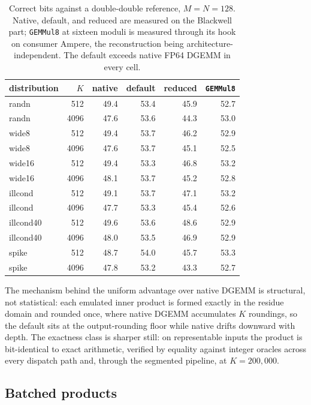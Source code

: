 \documentclass[11pt]{amsart}
\theoremstyle{plain}
\theoremstyle{definition}
\newcommand{\code}[1]{\texttt{#1}}
\newcommand{\gemmul}{\code{GEMMul8}}
\begin{document}
\begin{table}[t]
\centering
\caption{Correct bits against a double-double reference, $M = N = 128$.
Native, default, and reduced are measured on the Blackwell part;
\gemmul{} at sixteen moduli is measured through its hook on consumer
Ampere, the reconstruction being architecture-independent. The default
exceeds native FP64 DGEMM in every cell.}
\label{tab:accuracy}
\begin{tabular}{lrrrrr}
\toprule
distribution & $K$ & native & default & reduced & \gemmul{} \\
\midrule
randn & 512 & 49.4 & 53.4 & 45.9 & 52.7 \\
randn & 4096 & 47.6 & 53.6 & 44.3 & 53.0 \\
wide8 & 512 & 49.4 & 53.7 & 46.2 & 52.9 \\
wide8 & 4096 & 47.6 & 53.7 & 45.1 & 52.5 \\
wide16 & 512 & 49.4 & 53.3 & 46.8 & 53.2 \\
wide16 & 4096 & 48.1 & 53.7 & 45.2 & 52.8 \\
illcond & 512 & 49.1 & 53.7 & 47.1 & 53.2 \\
illcond & 4096 & 47.7 & 53.3 & 45.4 & 52.6 \\
illcond40 & 512 & 49.6 & 53.6 & 48.6 & 52.9 \\
illcond40 & 4096 & 48.0 & 53.5 & 46.9 & 52.9 \\
spike & 512 & 48.7 & 54.0 & 45.7 & 53.3 \\
spike & 4096 & 47.8 & 53.2 & 43.3 & 52.7 \\
\bottomrule
\end{tabular}
\end{table}

The mechanism behind the uniform advantage over native DGEMM is
structural, not statistical: each emulated inner product is formed exactly
in the residue domain and rounded once, where native DGEMM accumulates
$K$ roundings, so the default sits at the output-rounding floor while
native drifts downward with depth. The exactness class is sharper still:
on representable inputs the product is bit-identical to exact arithmetic,
verified by equality against integer oracles across every dispatch path
and, through the segmented pipeline, at $K = 200{,}000$.

\subsection{Batched products}\label{sec:batched}
\end{document}
